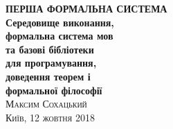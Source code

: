 \frontmatter
\thispagestyle{empty}
\mbox{}\vspace{1in}
\noindent
\begin{flushright}
\vspace{0.5cm}
\textbf{\Huge ПЕРША ФОРМАЛЬНА СИСТЕМА} \\
\vspace{0.5cm}
\textbf{\huge Середовище виконання, \\
        \huge формальна система мов \\
        \huge та базові бібліотеки \\
        \huge для програмування, \\
        \huge доведення теорем і \\
        \huge формальної філософії \\
}
\vspace{1em}
\vspace{6cm}
\hfill{\Large\scshape{}Максим Сохацький}
\\
\vspace{0.3cm}
\hfill{\scshape{}Київ, 12 жовтня 2018}
\end{flushright}
\cleartorecto
\tableofcontents*
\mainmatter
